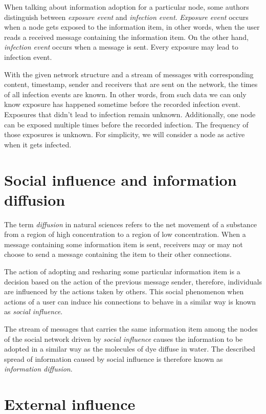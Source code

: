 \documentclass[times, utf8, zavrsni]{fer}
\begin{document}
 When talking about information adoption for a particular node, some authors \cite{leskovec} distinguish between \emph{exposure event} and \emph{infection event}. \emph{Exposure event} occurs when a node gets exposed to the information item, in other words, when the user reads a received message containing the information item. On the other hand, \emph{infection event} occurs when a message is sent. Every exposure may lead to infection event. 
 
With the given network structure and a stream of messages with corresponding content, timestamp, sender and receivers that are sent on the network, the times of all infection events are known. In other words, from such data we can only know exposure has happened sometime before the recorded infection event. Exposures that  didn't lead to infection remain unknown. Additionally, one node can be exposed multiple times before the recorded infection. The frequency of those exposures is unknown. For simplicity, we will consider a node as active when it gets infected.

\section{Social influence and information diffusion}

The term \emph{diffusion} in natural sciences refers to the net movement of a substance from a region of high concentration to a region of low concentration. When a message containing some information item is sent, receivers may or may not choose to send a message containing the item to their other connections. 

The action of adopting and resharing some particular information item is a decision based on the action of the previous message sender, therefore, individuals are influenced by the actions taken by others. This social phenomenon when actions of a user can induce his connections to behave in a similar way is known as \emph{social influence}. 

The stream of messages that carries the same information item among the nodes of the social network driven by  \emph{social influence} causes the information to be adopted in a similar way as the molecules of dye diffuse  in water. The described spread of information caused by social influence is therefore known as \emph{information diffusion}.

\section{External influence}
\end{document}
